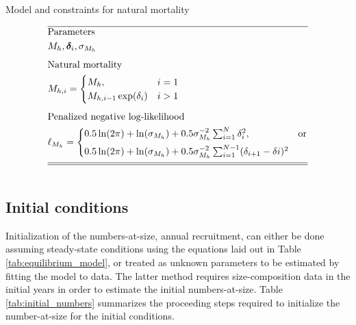 \documentclass[12pt,letterpaper]{article}
\newcounter{saveEq}
\def\putEq{\setcounter{saveEq}{\value{equation}}}
\def\getEq{\setcounter{equation}{\value{saveEq}}}
\def\tableEq{ %
    \putEq \setcounter{equation}{0}
    \renewcommand{\theequation}{T\arabic{table}.\arabic{equation}}
    \vspace{-5mm}
    }
\def\normalEq{ %
    \getEq
    \renewcommand{\theequation}{\arabic{section}.\arabic{equation}}}
\begin{document}
    \begin{table}
      \centering
      \caption{Model and constraints for natural mortality}
      \label{tab:natural_mortality}
      \tableEq
      \begin{align}
      \hline \nonumber
      &\mbox{Parameters} \nonumber \\
      & M_h, \bm{\delta}_i, \sigma_{M_h} \label{T5.1} \\[1ex]
      &\mbox{Natural mortality} \nonumber \\
      & M_{h,i} =
      \begin{cases}
        M_h, &i=1\\
        M_{h,i-1} \exp(\delta_i) &i>1
      \end{cases} \label{T5.2} \\[1ex]
      &\mbox{Penalized negative log-likelihood} \nonumber \\
      &\ell_{M_h} = 
      \begin{cases}
      0.5 \ln(2 \pi) + \ln(\sigma_{M_h}) 
      + 0.5 \sigma_{M_h}^{-2} \sum_{i=1}^{N} \delta_{i}^2, & \mbox{or}  \\[1ex]
      0.5 \ln(2 \pi) + \ln(\sigma_{M_h}) 
      + 0.5 \sigma_{M_h}^{-2}\sum_{i=1}^{N-1}(\delta_{i+1} - \delta{i})^{2}  \\
      \end{cases}\label{T5.3}\\[1ex]
      \hline \hline \nonumber
      \end{align}
      \normalEq
    \end{table}


    \subsection*{Initial conditions} %
    \label{sub:initial_conditions}
      Initialization of the numbers-at-size, annual recruitment, can either be done assuming steady-state conditions using the equations laid out in Table \ref{tab:equilibrium_model}, or treated as unknown parameters to be estimated by fitting the model to data.  The latter method requires size-composition data in the initial years in order to estimate the initial numbers-at-size.  Table \ref{tab:initial_numbers} summarizes the proceeding steps required to initialize the number-at-size for the initial conditions.
\end{document}
